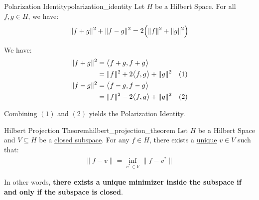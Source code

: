 \begin{lemma}{Polarization Identity}{polarization_identity}
    Let $H$ be a Hilbert Space. For all $f,g\in H$, we have:
    \begin{align*}
        \|f + g\|^2 + \|f - g\|^2 = 2\Big(  \|f\|^2 + \|g\|^2  \Big)
    \end{align*}
\end{lemma}

\begin{proof*}
    We have:
    \begin{align*}
        \|f+g\|^2 &= \big<f + g, f + g\big> \\
            &= \|f\|^2 + 2 \big<f, g\big> + \|g\|^2 \ \ \ (1) \\
        \|f-g\|^2 &= \big<f - g, f - g\big> \\
            &= \|f\|^2 - 2 \big<f, g\big> + \|g\|^2 \ \ \ (2) \\
    \end{align*}

    \noindent Combining $(1)$ and $(2)$ yields the Polarization Identity.
\end{proof*}

\begin{theorem}{Hilbert Projection Theorem}{hilbert_projection_theorem}
    Let $H$ be a Hilbert Space and $V\subseteq H$ be a \underline{closed subspace}. For any $f\in H$, there exists a \underline{unique} $v \in V$ such that:
    \begin{align*}
        \|f  - v\| = \inf_{v^* \in V} \| f - v^*\|
    \end{align*}

    In other words, \textbf{there exists a unique minimizer inside the subspace if and only if the subspace is closed}.
\end{theorem}

